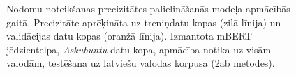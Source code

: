 \begin{figure}[h] 
   \centering
   \caption{Nodomu noteikšanas precizitātes palielināšanās modeļa apmācībās gaitā. Precizitāte aprēķināta uz treniņdatu kopas (zilā līnija) un validācijas datu kopas (oranžā līnija). Izmantota mBERT jēdzientelpa, \textit{Askubuntu} datu kopa, apmācība notika uz visām valodām, testēšana uz latviešu valodas korpusa (2ab metodes).} 
   \label{fig:askubuntu-bert-all}
\end{figure}


